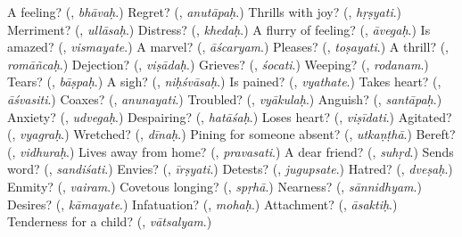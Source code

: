 \begin{tcolorbox}[breakable,colback=teal!4,colframe=teal!35!black,title={Before you move on}]
A feeling? (\textbf{}, \emph{bhāvaḥ}.) Regret? (\textbf{}, \emph{anutāpaḥ}.) Thrills with joy? (\textbf{}, \emph{hṛṣyati}.) Merriment? (\textbf{}, \emph{ullāsaḥ}.) Distress? (\textbf{}, \emph{khedaḥ}.) A flurry of feeling? (\textbf{}, \emph{āvegaḥ}.) Is amazed? (\textbf{}, \emph{vismayate}.) A marvel? (\textbf{}, \emph{āścaryam}.) Pleases? (\textbf{}, \emph{toṣayati}.) A thrill? (\textbf{}, \emph{romāñcaḥ}.) Dejection? (\textbf{}, \emph{viṣādaḥ}.) Grieves? (\textbf{}, \emph{śocati}.) Weeping? (\textbf{}, \emph{rodanam}.) Tears? (\textbf{}, \emph{bāṣpaḥ}.) A sigh? (\textbf{}, \emph{niḥśvāsaḥ}.) Is pained? (\textbf{}, \emph{vyathate}.) Takes heart? (\textbf{}, \emph{āśvasiti}.) Coaxes? (\textbf{}, \emph{anunayati}.) Troubled? (\textbf{}, \emph{vyākulaḥ}.) Anguish? (\textbf{}, \emph{santāpaḥ}.) Anxiety? (\textbf{}, \emph{udvegaḥ}.) Despairing? (\textbf{}, \emph{hatāśaḥ}.) Loses heart? (\textbf{}, \emph{viṣīdati}.) Agitated? (\textbf{}, \emph{vyagraḥ}.) Wretched? (\textbf{}, \emph{dīnaḥ}.) Pining for someone absent? (\textbf{}, \emph{utkaṇṭhā}.) Bereft? (\textbf{}, \emph{vidhuraḥ}.) Lives away from home? (\textbf{}, \emph{pravasati}.) A dear friend? (\textbf{}, \emph{suhṛd}.) Sends word? (\textbf{}, \emph{sandiśati}.) Envies? (\textbf{}, \emph{īrṣyati}.) Detests? (\textbf{}, \emph{jugupsate}.) Hatred? (\textbf{}, \emph{dveṣaḥ}.) Enmity? (\textbf{}, \emph{vairam}.) Covetous longing? (\textbf{}, \emph{spṛhā}.) Nearness? (\textbf{}, \emph{sānnidhyam}.) Desires? (\textbf{}, \emph{kāmayate}.) Infatuation? (\textbf{}, \emph{mohaḥ}.) Attachment? (\textbf{}, \emph{āsaktiḥ}.) Tenderness for a child? (\textbf{}, \emph{vātsalyam}.)
\end{tcolorbox}
